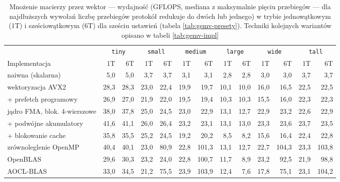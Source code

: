 \documentclass[a4paper,12pt]{book} %
\begin{document}
\begin{table}[t!]
\centering
\caption{Mnożenie macierzy przez wektor --- wydajność (GFLOPS, mediana z maksymalnie pięciu przebiegów --- dla najdłuższych wywołań liczbę przebiegów protokół redukuje do dwóch lub jednego) w trybie jednowątkowym (1T) i sześciowątkowym (6T) dla sześciu ustawień (tabela \ref{tab:gemv-presety}). Techniki kolejnych wariantów opisano w tabeli \ref{tab:gemv-impl}}
\label{tab:wyniki-gemv}
{\footnotesize
\setlength{\tabcolsep}{3pt}
\begin{tabular}{p{2.7cm} rr rr rr rr rr rr}
\hline
 & \multicolumn{2}{c}{\texttt{tiny}} & \multicolumn{2}{c}{\texttt{small}} & \multicolumn{2}{c}{\texttt{medium}} & \multicolumn{2}{c}{\texttt{large}} & \multicolumn{2}{c}{\texttt{wide}} & \multicolumn{2}{c}{\texttt{tall}} \\
Implementacja & 1T & 6T & 1T & 6T & 1T & 6T & 1T & 6T & 1T & 6T & 1T & 6T \\
\hline
naiwna (skalarna)            &  5,0 &  5,0 &  3,7 &  3,7 &  3,1 &   3,1 &  2,8 &  2,8 &  3,0 &   3,0 &  3,7 &   3,7 \\
wektoryzacja AVX2            & 28,3 & 28,3 & 23,0 & 22,4 & 19,9 &  19,7 & 10,1 & 10,0 & 16,0 &  16,5 & 22,5 &  22,5 \\
{}+ prefetch programowy      & 26,9 & 27,0 & 21,9 & 22,0 & 19,5 &  19,4 & 10,3 & 10,3 & 15,5 &  16,0 & 22,3 &  22,3 \\
jądro FMA, blok. 4-wierszowe & 38,0 & 37,8 & 25,0 & 24,5 & 23,0 &  22,9 & 13,1 & 12,7 & 22,9 &  23,2 & 22,6 &  22,9 \\
{}+ podwójne akumulatory     & 41,6 & 41,1 & 26,0 & 26,4 & 23,2 &  23,1 & 13,1 & 13,0 & 23,3 &  23,6 & 23,7 &  23,5 \\
{}+ blokowanie cache         & 35,8 & 35,5 & 25,2 & 24,5 & 19,2 &  20,2 &  8,5 &  8,2 & 15,6 &  16,4 & 22,4 &  22,8 \\
zrównoleglenie OpenMP        & 40,4 & 40,1 & 23,0 & 80,9 & 22,8 & 101,3 & 13,1 & 12,7 & 22,7 & 104,3 & 23,3 & 103,8 \\
OpenBLAS                     & 29,6 & 30,3 & 23,2 & 24,0 & 22,8 & 100,7 & 11,7 &  8,9 & 23,2 &  92,5 & 21,9 &  98,8 \\
AOCL-BLAS                    & 33,0 & 34,5 & 21,2 & 75,5 & 23,9 & 103,9 & 12,4 &  7,6 & 17,8 &  75,1 & 23,1 & 104,2 \\
\hline
\end{tabular}
}
\end{table}
\end{document}
